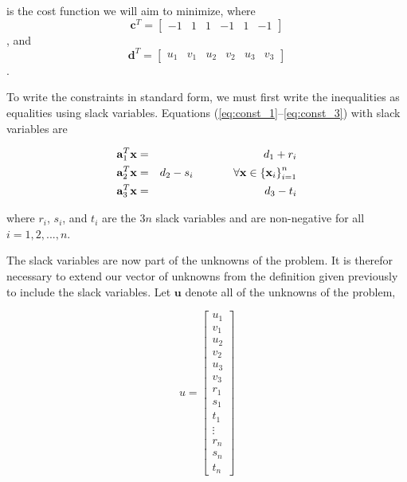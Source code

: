 \documentclass{article}
\begin{document}
\noindent is the cost function we will aim to minimize, where \[\mathbf{c}^T = \begin{bmatrix}-1 & 1 & 1 & -1 & 1 & -1\end{bmatrix}\], and \[\mathbf{d}^T = \begin{bmatrix}u_1 & v_1 & u_2 & v_2 & u_3 & v_3\end{bmatrix}\].

To write the constraints in standard form, we must first write the inequalities as equalities using slack variables.
Equations (\ref{eq:const_1}--\ref{eq:const_3}) with slack variables are

\begin{eqnarray}
\label{eq:lp_const_1} \mathbf{a}_1^T \mathbf{x} &=& d_1 + r_i\\
\label{eq:lp_const_2} \mathbf{a}_2^T \mathbf{x} &=& d_2 - s_i \hspace{0.5in} \forall{\mathbf{x}} \in \left\{ \mathbf{x}_i \right\}_{i=1}^n\\
\label{eq:lp_const_3} \mathbf{a}_3^T \mathbf{x} &=& d_3 - t_i
\end{eqnarray}

\noindent where $r_i$, $s_i$, and $t_i$ are the $3n$ slack variables and are non-negative for all $i = 1, 2, ..., n$.

The slack variables are now part of the unknowns of the problem.
It is therefor necessary to extend our vector of unknowns from the definition given previously to include the slack variables.
Let $\mathbf{u}$ denote all of the unknowns of the problem,

\begin{equation} \label{eq:u}
u = \begin{bmatrix}
u_1 \\ v_1 \\ u_2 \\ v_2 \\ u_3 \\ v_3 \\
r_1 \\ s_1 \\ t_1 \\ %
\vdots \\ r_n \\ s_n \\ t_n
\end{bmatrix}
\end{equation}
\end{document}
